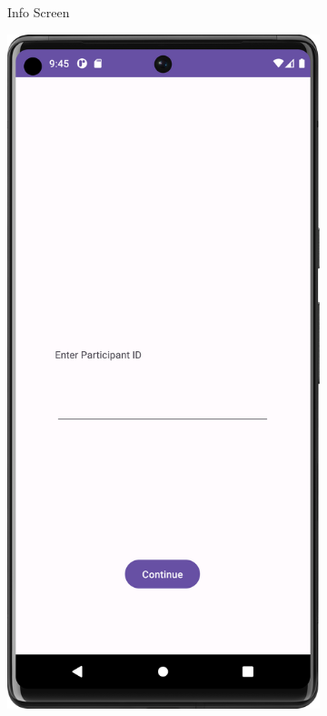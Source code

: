 \begin{figure}[htbp]
\begin{subfigure}[b]{0.25\textwidth}
        \caption{Info Screen}
        \label{subfig:InfoScreenPixel}
    \end{subfigure}
        \hspace{1cm}
    \begin{subfigure}[b]{0.25\textwidth}
        \centering
        \includegraphics[width=\textwidth]{content/07_evaluation_of_the_solution/Screenshot_T10b.png}

\end{subfigure}
\end{figure}
